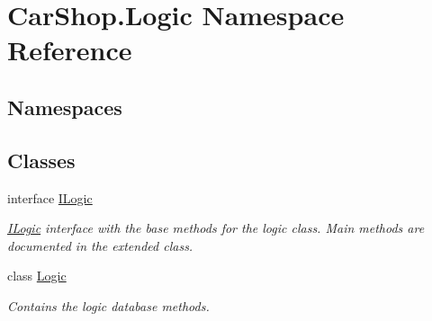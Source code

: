 \hypertarget{namespace_car_shop_1_1_logic}{}\section{Car\+Shop.\+Logic Namespace Reference}
\label{namespace_car_shop_1_1_logic}
\subsection*{Namespaces}
\begin{DoxyCompactItemize}
\end{DoxyCompactItemize}
\subsection*{Classes}
\begin{DoxyCompactItemize}
\item 
interface \mbox{\hyperlink{interface_car_shop_1_1_logic_1_1_i_logic}{I\+Logic}}
\begin{DoxyCompactList}\small\item\em \mbox{\hyperlink{interface_car_shop_1_1_logic_1_1_i_logic}{I\+Logic}} interface with the base methods for the logic class. Main methods are documented in the extended class. \end{DoxyCompactList}\item 
class \mbox{\hyperlink{class_car_shop_1_1_logic_1_1_logic}{Logic}}
\begin{DoxyCompactList}\small\item\em Contains the logic database methods. \end{DoxyCompactList}\end{DoxyCompactItemize}
